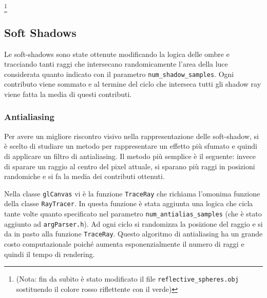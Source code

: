 \begin{figure}[hbt]
    \centering
    \vspace{-0.2cm}
	\vspace{-0.5cm}
\end{figure}\footnote{(Nota: fin da subito è stato modificato il file \texttt{reflective\_\-spheres.obj} sostituendo il colore rosso riflettente con il verde)}


\newpage
\subsection{Soft Shadows}
Le soft-shadows sono state ottenute modificando la logica delle ombre e tracciando tanti raggi che intersecano randomicamente l'area della luce considerata quanto indicato con il parametro \texttt{num\_\-shadow\_\-samples}. Ogni contributo viene sommato e al termine del ciclo che interseca tutti gli shadow ray viene fatta la media di questi contributi.

\begin{figure}[hbt]
	\vspace{-0.3cm}
    \centering
	\vspace{-0.7cm}
\end{figure}

\subsubsection{Antialiasing}
Per avere un migliore riscontro visivo nella rappresentazione delle soft-shadow, si è scelto di studiare un metodo per rappresentare un effetto più sfumato e quindi di applicare un filtro di antialiasing. Il metodo più semplice è il seguente: invece di sparare un raggio al centro del pixel attuale, si sparano più raggi in posizioni randomiche e si fa la media dei contributi ottenuti. 

Nella classe \texttt{glCanvas} vi è la funzione \texttt{TraceRay} che richiama l'omonima funzione della classe \texttt{RayTracer}. In questa funzione è stata aggiunta una logica che cicla tante volte quanto specificato nel parametro \texttt{num\_\-antialias\_\-samples} (che è stato aggiunto ad \texttt{argParser.h}). Ad ogni ciclo si randomizza la posizione del raggio e si da in pasto alla funzione \texttt{TraceRay}. Questo algoritmo di antialiasing ha un grande costo computazionale poiché aumenta esponenzialmente il numero di raggi e quindi il tempo di rendering.

